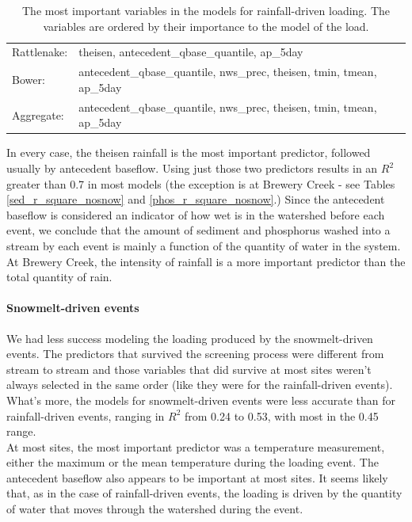 \documentclass[10pt]{article}
\begin{document}
\begin{table}[h!]
\begin{center}
\begin{tabular}{ll}
        \hspace{5mm} Rattlenake: & theisen, antecedent\_qbase\_quantile, ap\_5day\\
        \hspace{5mm} Bower: & antecedent\_qbase\_quantile, nws\_prec, theisen, tmin, tmean, ap\_5day\\
        \hspace{5mm} Aggregate: & antecedent\_qbase\_quantile, nws\_prec, theisen, tmin, tmean, ap\_5day\\
    \end{tabular}
    \caption{The most important variables in the models for rainfall-driven loading. The variables are ordered by their importance to the model of the load. \label{nosnow_predictor_list}}
    \end{center}
\end{table}

In every case, the theisen rainfall is the most important predictor, followed usually by antecedent baseflow. Using just those two predictors results in an $R^2$ greater than 0.7 in most models (the exception is at Brewery Creek - see Tables \ref{sed_r_square_nosnow} and \ref{phos_r_square_nosnow}.) Since the antecedent baseflow is considered an indicator of how wet is in the watershed before each event, we conclude that the amount of sediment and phosphorus washed into a stream by each event is mainly a function of the quantity of water in the system. At Brewery Creek, the intensity of rainfall is a more important predictor than the total quantity of rain.\\

\paragraph{Snowmelt-driven events} We had less success modeling the loading produced by the snowmelt-driven events. The predictors that survived the screening process were different from stream to stream and those variables that did survive at most sites weren't always selected in the same order (like they were for the rainfall-driven events). What's more, the models for snowmelt-driven events were less accurate than for rainfall-driven events, ranging in $R^2$ from 0.24 to 0.53, with most in the 0.45 range.\\

At most sites, the most important predictor was a temperature measurement, either the maximum or the mean temperature during the loading event. The antecedent baseflow also appears to be important at most sites. It seems likely that, as in the case of rainfall-driven events, the loading is driven by the quantity of water that moves through the watershed during the event.
\end{document}
